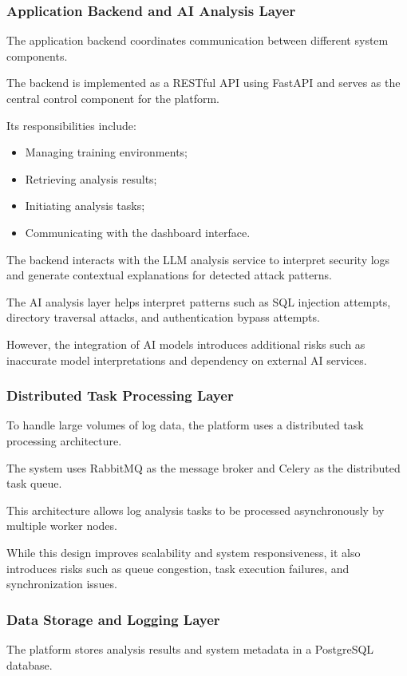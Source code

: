 \subsubsection{Application Backend and AI Analysis Layer}
The application backend coordinates communication between different system components.

The backend is implemented as a RESTful API using FastAPI and serves as the central control component for the platform.

Its responsibilities include:
\begin{itemize}
    \item Managing training environments;
    \item Retrieving analysis results;
    \item Initiating analysis tasks;
    \item Communicating with the dashboard interface.
\end{itemize}
The backend interacts with the LLM analysis service to interpret security logs and generate contextual explanations for detected attack patterns.

The AI analysis layer helps interpret patterns such as SQL injection attempts, directory traversal attacks, and authentication bypass attempts.

However, the integration of AI models introduces additional risks such as inaccurate model interpretations and dependency on external AI services.

\subsubsection{Distributed Task Processing Layer}
To handle large volumes of log data, the platform uses a distributed task processing architecture.

The system uses RabbitMQ as the message broker and Celery as the distributed task queue.

This architecture allows log analysis tasks to be processed asynchronously by multiple worker nodes.

While this design improves scalability and system responsiveness, it also introduces risks such as queue congestion, task execution failures, and synchronization issues.

\subsubsection{Data Storage and Logging Layer}
The platform stores analysis results and system metadata in a PostgreSQL database.

